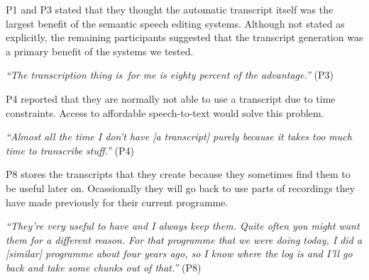 P1 and P3 stated that they thought the automatic transcript itself was the largest benefit of the semantic speech
editing systems.  Although not stated as explicitly, the remaining participants suggested that the transcript
generation was a primary benefit of the systems we tested.

\textit{``The transcription thing is for me is eighty percent of the advantage.''} (P3)

P4 reported that they are normally not able to use a transcript due to time constraints. Access to affordable
speech-to-text would solve this problem.

\textit{``Almost all the time I don't have [a transcript] purely because it takes too much time to transcribe stuff.''}
(P4)

P8 stores the transcripts that they create because they sometimes find them to be useful later on. Ocassionally they
will go back to use parts of recordings they have made previously for their current programme.

\textit{``They're very useful to have and I always keep them. Quite often you might want them for a different reason.
  For that programme that we were doing today, I did a [similar] programme about four years ago, so I know where the log
is and I'll go back and take some chunks out of that.''} (P8)












